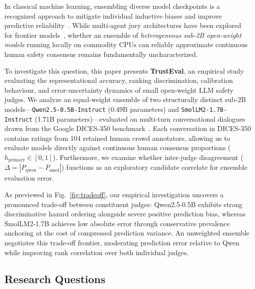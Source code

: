 In classical machine learning, ensembling diverse model checkpoints is a recognized approach to mitigate individual inductive biases and improve predictive reliability~\cite{lakshminarayanan2017simple,ovadia2019can}. While multi-agent jury architectures have been explored for frontier models~\cite{verga2024replacing,qian2026who}, whether an ensemble of \textit{heterogeneous sub-2B open-weight models} running locally on commodity CPUs can reliably approximate continuous human safety consensus remains fundamentally uncharacterized.

To investigate this question, this paper presents \textbf{TrustEval}, an empirical study evaluating the representational accuracy, ranking discrimination, calibration behaviour, and error-uncertainty dynamics of small open-weight LLM safety judges. We analyze an equal-weight ensemble of two structurally distinct sub-2B models—\texttt{Qwen2.5-0.5B-Instruct} (0.49B parameters) and \texttt{SmolLM2-1.7B-Instruct} (1.71B parameters)—evaluated on multi-turn conversational dialogues drawn from the Google DICES-350 benchmark~\cite{aroyo2023dices}. Each conversation in DICES-350 contains ratings from 104 retained human crowd annotators, allowing us to evaluate models directly against continuous human consensus proportions ($h_{\text{primary}} \in [0, 1]$). Furthermore, we examine whether inter-judge disagreement ($\Delta = |P_{\text{qwen}} - P_{\text{smol}}|$) functions as an exploratory candidate correlate for ensemble evaluation error.

As previewed in Fig.~\ref{fig:tradeoff}, our empirical investigation uncovers a pronounced trade-off between constituent judges: Qwen2.5-0.5B exhibits strong discriminative hazard ordering alongside severe positive prediction bias, whereas SmolLM2-1.7B achieves low absolute error through conservative prevalence anchoring at the cost of compressed prediction variance. An unweighted ensemble negotiates this trade-off frontier, moderating prediction error relative to Qwen while improving rank correlation over both individual judges.

\subsection{Research Questions}
\label{sec:rqs}

